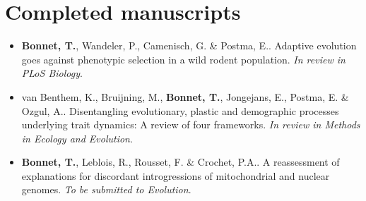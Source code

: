 \section{Completed manuscripts}
\vspace{10pt}
\begin{itemize}
\item \textbf{Bonnet, T.}, Wandeler, P., Camenisch, G. \& Postma, E.. Adaptive evolution goes against phenotypic selection in a wild rodent population. \textit{In review in PLoS Biology}.
\item van Benthem, K., Bruijning, M., \textbf{Bonnet, T.}, Jongejans, E., Postma, E. \& Ozgul, A.. Disentangling evolutionary, plastic and demographic processes underlying trait dynamics: A review of four frameworks. \textit{In review in Methods in Ecology and Evolution}.
\item \textbf{Bonnet, T.}, Leblois, R., Rousset, F. \& Crochet, P.A.. A reassessment of explanations for discordant introgressions of mitochondrial and nuclear genomes. \textit{To be submitted to Evolution}.
\end{itemize}

